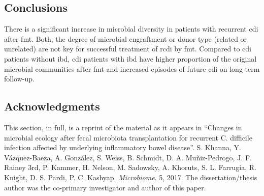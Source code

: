 \subsection{Conclusions}

There is a significant increase in microbial diversity in patients with recurrent \gls{cdi} after \gls{fmt}. Both, the degree of microbial engraftment or donor type (related or unrelated) are not key for successful treatment of \gls{rcdi} by \gls{fmt}. Compared to \gls{cdi} patients without \gls{ibd}, \gls{cdi} patients with \gls{ibd} have higher proportion of the original microbial communities after \gls{fmt} and increased episodes of future \gls{cdi} on long-term follow-up.

\subsection{Acknowledgments}

This section, in full, is a reprint of the material as it appears in ``Changes 
in microbial ecology after fecal microbiota transplantation for recurrent C.  
difficile infection affected by underlying inflammatory bowel disease''. S.  
Khanna, Y.  V\'azquez-Baeza, A.  Gonz\'alez, S. Weiss, B.  Schmidt, D. A.  
Muñiz-Pedrogo, J. F. Rainey 3rd, P. Kammer, H. Nelson, M.  Sadowsky, A.  
Khoruts, S. L. Farrugia, R. Knight, D. S.  Pardi, P. C.  Kashyap.  
\emph{Microbiome}. 5, 2017. The dissertation/thesis author was the co-primary 
investigator and author of this paper.
